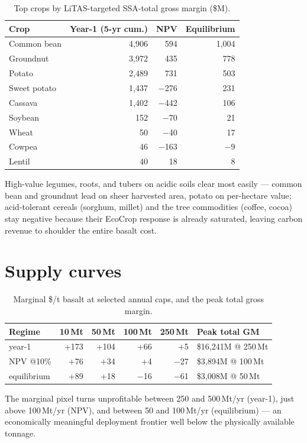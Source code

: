\documentclass[openany]{book}
\begin{document}
\begin{longtable}[]{@{}lrrr@{}}
\caption{Top crops by LiTAS-targeted SSA-total gross margin (\$M).}\label{tbl:crops}\\
\toprule
Crop & Year-1 (5-yr cum.) & NPV & Equilibrium \\
\midrule
\endhead
Common bean & 4,906 & 594 & 1,004 \\
Groundnut & 3,972 & 435 & 778 \\
Potato & 2,489 & 731 & 503 \\
Sweet potato & 1,437 & $-$276 & 231 \\
Cassava & 1,402 & $-$442 & 106 \\
Soybean & 152 & $-$70 & 21 \\
Wheat & 50 & $-$40 & 17 \\
Cowpea & 46 & $-$163 & $-$9 \\
Lentil & 40 & 18 & 8 \\
\bottomrule
\end{longtable}

High-value legumes, roots, and tubers on acidic soils clear most easily ---
common bean and groundnut lead on sheer harvested area, potato on per-hectare
value; acid-tolerant cereals (sorghum, millet) and the tree commodities (coffee,
cocoa) stay negative because their EcoCrop response is already saturated, leaving
carbon revenue to shoulder the entire basalt cost.

\section{Supply curves}

\begin{longtable}[]{@{}lrrrrl@{}}
\caption{Marginal \$/t basalt at selected annual caps, and the peak total
gross margin.}\label{tbl:supply}\\
\toprule
Regime & 10\,Mt & 50\,Mt & 100\,Mt & 250\,Mt & Peak total GM \\
\midrule
\endhead
year-1 & +173 & +104 & +66 & +5 & \$16,241M @ 250\,Mt \\
NPV @10\% & +76 & +34 & +4 & $-$27 & \$3,894M @ 100\,Mt \\
equilibrium & +89 & +18 & $-$16 & $-$61 & \$3,008M @ 50\,Mt \\
\bottomrule
\end{longtable}

The marginal pixel turns unprofitable between 250 and 500\,Mt/yr (year-1),
just above 100\,Mt/yr (NPV), and between 50 and 100\,Mt/yr (equilibrium) --- an
economically meaningful deployment frontier well below the physically available
tonnage.
\end{document}
